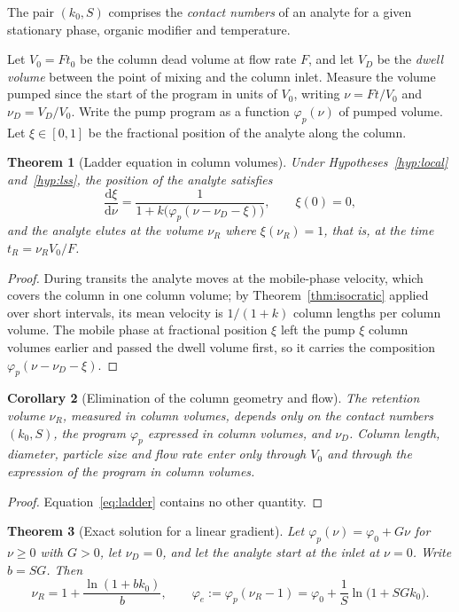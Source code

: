 \documentclass[11pt,a4paper]{article}
\newtheorem{theorem}{Theorem}[section]
\newtheorem{corollary}[theorem]{Corollary}
\theoremstyle{definition}
\theoremstyle{remark}
\newcommand{\dd}{\mathrm{d}}
\begin{document}
The pair $(k_0,S)$ comprises the \emph{contact numbers} of an analyte for a given stationary phase, organic modifier and temperature.

Let $V_0=Ft_0$ be the column dead volume at flow rate $F$, and let $V_D$ be the \emph{dwell volume} between the point of mixing and the column inlet.
Measure the volume pumped since the start of the program in units of $V_0$, writing $\nu=Ft/V_0$ and $\nu_D=V_D/V_0$.
Write the pump program as a function $\varphi_p(\nu)$ of pumped volume.
Let $\xi\in[0,1]$ be the fractional position of the analyte along the column.

\begin{theorem}[Ladder equation in column volumes]
\label{thm:ladder-eq}
Under Hypotheses~\ref{hyp:local} and~\ref{hyp:lss}, the position of the analyte satisfies
\begin{equation}
\frac{\dd\xi}{\dd\nu}=\frac{1}{1+k\bigl(\varphi_p(\nu-\nu_D-\xi)\bigr)},\qquad \xi(0)=0,
\label{eq:ladder}
\end{equation}
and the analyte elutes at the volume $\nu_R$ where $\xi(\nu_R)=1$, that is, at the time $t_R=\nu_RV_0/F$.
\end{theorem}

\begin{proof}
During transits the analyte moves at the mobile-phase velocity, which covers the column in one column volume; by Theorem~\ref{thm:isocratic} applied over short intervals, its mean velocity is $1/(1+k)$ column lengths per column volume.
The mobile phase at fractional position $\xi$ left the pump $\xi$ column volumes earlier and passed the dwell volume first, so it carries the composition $\varphi_p(\nu-\nu_D-\xi)$.
\end{proof}

\begin{corollary}[Elimination of the column geometry and flow]
\label{cor:scale}
The retention volume $\nu_R$, measured in column volumes, depends only on the contact numbers $(k_0,S)$, the program $\varphi_p$ expressed in column volumes, and $\nu_D$.
Column length, diameter, particle size and flow rate enter only through $V_0$ and through the expression of the program in column volumes.
\end{corollary}

\begin{proof}
Equation~\eqref{eq:ladder} contains no other quantity.
\end{proof}

\begin{theorem}[Exact solution for a linear gradient]
\label{thm:exact}
Let $\varphi_p(\nu)=\varphi_0+G\nu$ for $\nu\ge0$ with $G>0$, let $\nu_D=0$, and let the analyte start at the inlet at $\nu=0$.
Write $b=SG$.
Then
\begin{equation}
\nu_R=1+\frac{\ln(1+bk_0)}{b},
\qquad
\varphi_e:=\varphi_p(\nu_R-1)=\varphi_0+\frac1S\ln\bigl(1+SGk_0\bigr).
\label{eq:exact}
\end{equation}
\end{theorem}
\end{document}
